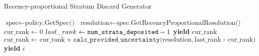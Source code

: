\begin{algorithm}
\caption{Recency-proportional Stratum Discard Generator}
\label{alg:recency-proportional-resolution-algo-gen-drop-ranks}
\begin{algorithmic}[1]
    \STATE $\text{spec} \gets \text{policy.GetSpec()}$
    \STATE $\text{resolution} \gets \text{spec.GetRecencyProportionalResolution()}$
    \STATE $\text{cur\_rank} \gets 0$
    \STATE $last\_rank \gets \texttt{num\_\text{strata}\_\text{deposited}} - 1$
        \STATE \textbf{yield} $\text{cur\_rank}$
        \STATE $\text{cur\_rank} \gets \text{cur\_rank} + \texttt{calc\_provided\_uncertainty(} \text{resolution}, \text{last\_rank - cur\_rank} \texttt{)}$
    \ENDWHILE
        \STATE \textbf{yield} $i$
    \ENDFOR
\end{algorithmic}

\end{algorithm}

